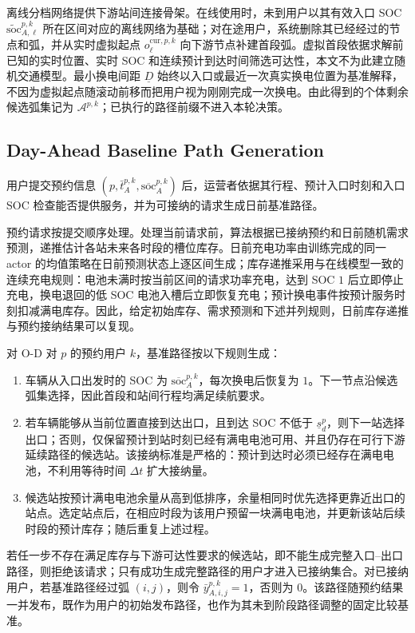 \documentclass[12pt,a4paper,UTF8]{ctexart}
\begin{document}
离线分档网络提供下游站间连接骨架。在线使用时，未到用户以其有效入口 SOC $\widetilde{\mathrm{soc}}_{A,\ell}^{p,k}$ 所在区间对应的离线网络为基础；对在途用户，系统删除其已经经过的节点和弧，并从实时虚拟起点 $o_\ell^{\mathrm{cur},p,k}$ 向下游节点补建首段弧。虚拟首段依据求解前已知的实时位置、实时 SOC 和连续预计到达时间筛选可达性，本文不为此建立随机交通模型。最小换电间距 $\underline D$ 始终以入口或最近一次真实换电位置为基准解释，不因为虚拟起点随滚动前移而把用户视为刚刚完成一次换电。由此得到的个体剩余候选弧集记为 $\mathcal A^{p,k}$；已执行的路径前缀不进入本轮决策。


\subsection{Day-Ahead Baseline Path Generation}

用户提交预约信息
$\left(p,\bar t_A^{p,k},\overline{\mathrm{soc}}_A^{p,k}\right)$
后，运营者依据其行程、预计入口时刻和入口 SOC 检查能否提供服务，并为可接纳的请求生成日前基准路径。

预约请求按提交顺序处理。处理当前请求前，算法根据已接纳预约和日前随机需求预测，递推估计各站未来各时段的槽位库存。日前充电功率由训练完成的同一 actor 的均值策略在日前预测状态上逐区间生成；库存递推采用与在线模型一致的连续充电规则：电池未满时按当前区间的请求功率充电，达到 SOC $1$ 后立即停止充电，换电退回的低 SOC 电池入槽后立即恢复充电；预计换电事件按预计服务时刻扣减满电库存。因此，给定初始库存、需求预测和下述并列规则，日前库存递推与预约接纳结果可以复现。

对 O-D 对 $p$ 的预约用户 $k$，基准路径按以下规则生成：
\begin{enumerate}
  \item 车辆从入口出发时的 SOC 为 $\overline{\mathrm{soc}}_A^{p,k}$，每次换电后恢复为 $1$。下一节点沿候选弧集选择，因此首段和站间行程均满足续航要求。
  \item 若车辆能够从当前位置直接到达出口，且到达 SOC 不低于 $\underline s_d^p$，则下一站选择出口；否则，仅保留预计到站时刻已经有满电电池可用、并且仍存在可行下游延续路径的候选站。该接纳标准是严格的：预计到达时必须已经存在满电电池，不利用等待时间 $\Delta t$ 扩大接纳量。
  \item 候选站按预计满电电池余量从高到低排序，余量相同时优先选择更靠近出口的站点。选定站点后，在相应时段为该用户预留一块满电电池，并更新该站后续时段的预计库存；随后重复上述过程。
\end{enumerate}

若任一步不存在满足库存与下游可达性要求的候选站，即不能生成完整入口--出口路径，则拒绝该请求；只有成功生成完整路径的用户才进入已接纳集合。对已接纳用户，若基准路径经过弧 $(i,j)$，则令 $\bar y_{A,i,j}^{p,k}=1$，否则为 $0$。该路径随预约结果一并发布，既作为用户的初始发布路径，也作为其未到阶段路径调整的固定比较基准。
\end{document}
